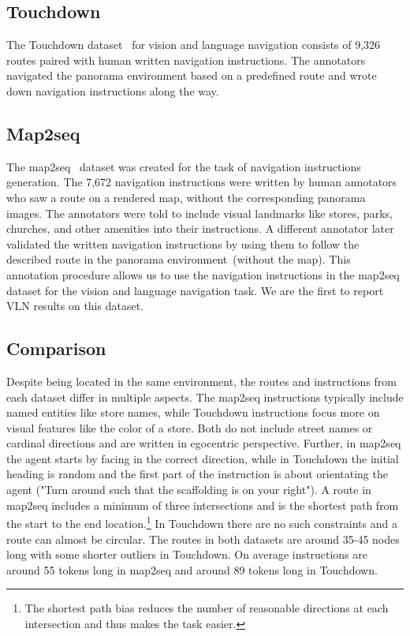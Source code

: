 \documentclass[11pt]{article}
\begin{document}
\subsection{Touchdown}
The Touchdown dataset~\cite{Chen2018Touchdown} for vision and language navigation consists of 9,326 routes paired with human written navigation instructions. The annotators navigated the panorama environment based on a predefined route and wrote down navigation instructions along the way. 
\subsection{Map2seq}
The map2seq~\cite{schumann-riezler-2021-map2seq} dataset was created for the task of navigation instructions generation. The 7,672 navigation instructions were written by human annotators who saw a route on a rendered map, without the corresponding panorama images. The annotators were told to include visual landmarks like stores, parks, churches, and other amenities into their instructions. A different annotator later validated the written navigation instructions by using them to follow the described route in the panorama environment~(without the map). This annotation procedure allows us to use the navigation instructions in the map2seq dataset for the vision and language navigation task. We are the first to report VLN results on this dataset.

\subsection{Comparison}
Despite being located in the same environment, the routes and instructions from each dataset differ in multiple aspects. The map2seq instructions typically include named entities like store names, while Touchdown instructions focus more on visual features like the color of a store. Both do not include street names or cardinal directions and are written in egocentric perspective.  Further, in map2seq the agent starts by facing in the correct direction, while in Touchdown the initial heading is random and the first part of the instruction is about orientating the agent ("Turn around such that the scaffolding is on your right"). A route in map2seq includes a minimum of three intersections and is the shortest path from the start to the end location.\footnote{The shortest path bias reduces the number of reasonable directions at each intersection and thus makes the task easier.} In Touchdown there are no such constraints and a route can almost be circular. The routes in both datasets are around 35-45 nodes long with some shorter outliers in Touchdown. On average instructions are around 55 tokens long in map2seq and around 89 tokens long in Touchdown.
\end{document}
